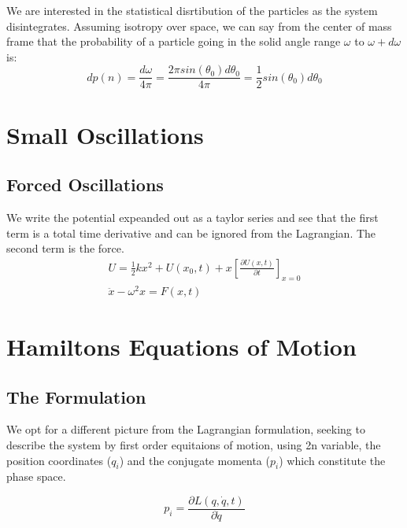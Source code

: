 We are interested in the statistical disrtibution of the particles as the system disintegrates. Assuming isotropy over space, we can say from the center of mass frame that the probability of a particle going in the solid angle range $\omega$ to $\omega + d\omega$ is:
\begin{equation}
    d p(n) 
        = \frac{d\omega}{4\pi} 
        = \frac{2\pi sin(\theta_0) d\theta_0}{4\pi} 
        = \frac{1}{2} sin(\theta_0) d\theta_0
\end{equation}



\section{Small Oscillations}

\subsection{Forced Oscillations}

We write the potential expeanded out as a taylor series and see that the first term is a total time derivative and can be ignored from the Lagrangian. The second term is the force.
\begin{eqnarray}
    U = \frac{1}{2} kx^2 + U(x_0, t) + x [\frac{\partial U(x, t)}{\partial t}]_{x=0} \\
    \ddot{x} - \omega^2 x = F(x, t)
\end{eqnarray}



\section{Hamiltons Equations of Motion}


\subsection{The Formulation}

We opt for a different picture from the Lagrangian formulation, seeking to describe the system by first order equitaions of motion, using 2n variable, the position coordinates ($q_i$) and the conjugate momenta ($p_i$) which constitute the phase space.

\begin{equation}
    p_i = \frac{\partial L(q, \dot{q}, t)}{\partial \dot{q}}
\end{equation}



